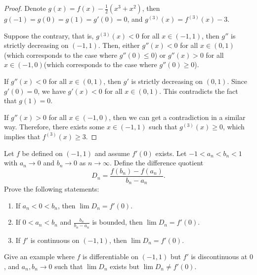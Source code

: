 \documentclass{article}
\begin{document}
\begin{proof}
  Denote \( g(x)=f(x)-\frac{1}{2}(x^3+x^2) \), then \( g(-1)=g(0)=g(1)=g'(0)=0 \), and \( g^{(3)}(x)=f^{(3)}(x)-3 \).\par
  Suppose the contrary, that is, \( g^{(3)}(x)<0 \) for all \( x\in(-1,1) \), then \( g'' \) is strictly decreasing on \( (-1,1) \). Then, either \( g''(x)<0 \) for all \( x\in(0,1) \)(which corresponds to the case where \( g''(0)\le 0 \)) or \( g''(x)>0 \) for all \( x\in(-1,0) \)(which corresponds to the case where \( g''(0)\ge 0 \)). \par
  If \( g''(x)<0 \) for all \( x\in(0,1) \), then \( g' \) is strictly decreasing on \( (0,1) \). Since \( g'(0)=0 \), we have \( g'(x)<0 \) for all \( x\in(0,1) \). This contradicts the fact that \( g(1)=0 \).\par
  If \( g''(x)>0 \) for all \( x\in(-1,0) \), then we can get a contradiction in a similar way. Therefore, there exists some \( x\in(-1,1) \) such that \( g^{(3)}(x)\ge 0 \), which implies that \( f^{(3)}(x)\ge 3 \).
\end{proof}



\begin{problem}[5-19]
Let $f$ be defined on $(-1,1)$ and assume $f'(0)$ exists. Let $-1<a_n<b_n<1$ with $a_n\to 0$ and $b_n\to 0$ as $n\to\infty$. Define the difference quotient
\[
D_n=\frac{f(b_n)-f(a_n)}{b_n-a_n}.
\]
Prove the following statements:
\begin{enumerate}[label=(\alph*)]
  \item If $a_n<0<b_n$, then $\lim D_n=f'(0)$.
  \item If $0<a_n<b_n$ and $\frac{b_n}{b_n-a_n}$ is bounded, then $\lim D_n=f'(0)$.
  \item If $f'$ is continuous on $(-1,1)$, then $\lim D_n=f'(0)$.
\end{enumerate}
Give an example where $f$ is differentiable on $(-1,1)$ but $f'$ is discontinuous at $0$, and $a_n,b_n\to 0$ such that $\lim D_n$ exists but $\lim D_n\ne f'(0)$.
\end{problem}
\end{document}
